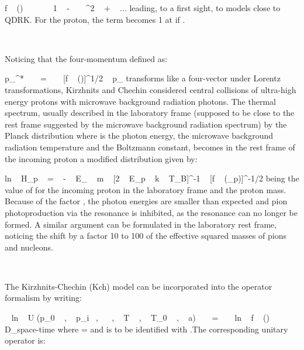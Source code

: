 \documentclass[a4paper,12pt,dvips]{article}
\begin{document}
\equation
f ~ (\xi ) ~ ~ \simeq ~ ~ 1 ~ - ~ \alpha ~ \xi ^2 ~ + ~ ...
\endequation
\noindent
leading, to a first sight, to models close to QDRK. For the proton, the term \coordHE{} becomes \myHighlight{$\approx $}\coordHE{} 1 at \coordHE{}  \myHighlight{$\approx $}\coordHE{}  \coordHE{} if \myHighlight{$\alpha $}\coordHE{}  \myHighlight{$\approx $}\coordHE{}  \coordHE{} .

~ 

Noticing that the four-momentum \coordHE{} defined as:

\equation
p_{\alpha}^* ~ ~ = ~ ~ [f ~ (\xi )]^{1/2}
 ~ p_{\alpha}
\endequation
\noindent
transforms like a four-vector under Lorentz transformations, Kirzhnits and Chechin considered central collisions of ultra-high energy protons with microwave background radiation photons. The thermal spectrum, usually described in the laboratory frame (supposed to be close to the rest frame suggested by the microwave background radiation spectrum) by the Planck distribution \coordHE{} where \coordHE{} is the photon energy, \coordHE{} the microwave background radiation temperature and \coordHE{} the Boltzmann constant, becomes in the rest frame of the incoming proton a modified distribution \coordHE{} given by:

\equation
ln ~ H_p ~ = ~ - ~ E_{\gamma } ~ m ~ [2 ~ E_p ~ k ~ T_B]^{-1} ~ [f ~ (\xi _p)]^{-1/2}
\endequation
\noindent
{}\coordHE{} being the value of \myHighlight{$\xi $}\coordHE{} for the incoming proton in the laboratory frame and \coordHE{} the proton mass. Because of the factor \coordHE{} , the photon energies are smaller than expected and pion photoproduction via the \myHighlight{$\Delta $}\coordHE{} resonance is inhibited, as the resonance can no longer be formed. A similar argument can be formulated in the laboratory rest frame, noticing the shift by a factor 10 to 100 of the effective squared masses of pions and nucleons.

~ 

The Kirzhnits-Chechin (Kch) model can be incorporated into the operator formalism by writing:

 ~ ln ~ U (p_0 ~ , ~ p_i ~,~ \sigma  ~ , ~ T ~ , ~ T_0 ~ , ~ a) ~ ~ = ~ ~ ln ~ f ~ (\xi )~ ~ D_{space-time}
\endequation
\noindent
where \coordHE{} = \coordHE{} and \coordHE{} is to be identified with \coordHE{} .The corresponding unitary operator is:
\end{document}
